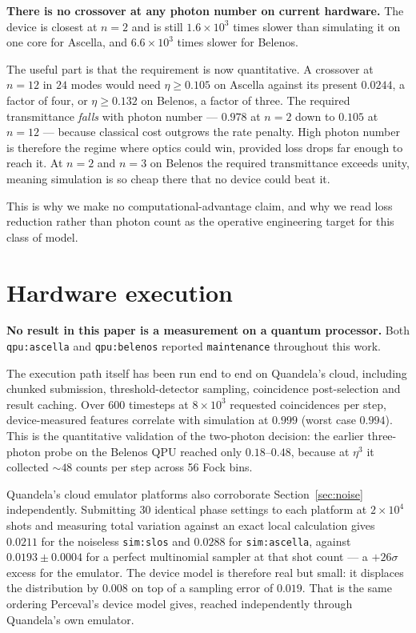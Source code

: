 \documentclass[11pt]{article}
\begin{document}
\textbf{There is no crossover at any photon number on current hardware.} The device is closest
at $n = 2$ and is still $1.6 \times 10^{3}$ times slower than simulating it on one core for
Ascella, and $6.6 \times 10^{3}$ times slower for Belenos.

The useful part is that the requirement is now quantitative. A crossover at $n = 12$ in $24$
modes would need $\eta \ge 0.105$ on Ascella against its present $0.0244$, a factor of four,
or $\eta \ge 0.132$ on Belenos, a factor of three. The required transmittance \emph{falls} with
photon number --- $0.978$ at $n=2$ down to $0.105$ at $n=12$ --- because classical cost
outgrows the rate penalty. High photon number is therefore the regime where optics could win,
provided loss drops far enough to reach it. At $n = 2$ and $n = 3$ on Belenos the required
transmittance exceeds unity, meaning simulation is so cheap there that no device could beat it.

This is why we make no computational-advantage claim, and why we read loss reduction rather
than photon count as the operative engineering target for this class of model.

\section{Hardware execution}\label{sec:hardware}

\textbf{No result in this paper is a measurement on a quantum processor.} Both
\texttt{qpu:ascella} and \texttt{qpu:belenos} reported \texttt{maintenance} throughout this
work.

The execution path itself has been run end to end on Quandela's cloud, including chunked
submission, threshold-detector sampling, coincidence post-selection and result caching. Over
600 timesteps at $8\!\times\!10^{3}$ requested coincidences per step, device-measured features
correlate with simulation at $0.999$ (worst case $0.994$). This is the quantitative validation
of the two-photon decision: the earlier three-photon probe on the Belenos QPU reached only
$0.18$--$0.48$, because at $\eta^{3}$ it collected $\sim\!48$ counts per step across 56 Fock
bins.

Quandela's cloud emulator platforms also corroborate Section~\ref{sec:noise} independently.
Submitting 30 identical phase settings to each platform at $2\!\times\!10^{4}$ shots and
measuring total variation against an exact local calculation gives $0.0211$ for the noiseless
\texttt{sim:slos} and $0.0288$ for \texttt{sim:ascella}, against $0.0193 \pm 0.0004$ for a
perfect multinomial sampler at that shot count --- a $+26\sigma$ excess for the emulator. The
device model is therefore real but small: it displaces the distribution by $0.008$ on top of a
sampling error of $0.019$. That is the same ordering Perceval's device model gives, reached
independently through Quandela's own emulator.
\end{document}
